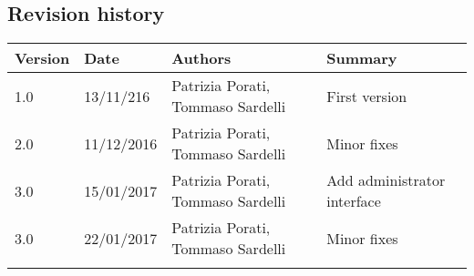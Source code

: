 \subsection{Revision history}
\begin{tabular}{|l|l|l|l|}
	\hline
	\textbf{Version}	& \textbf{Date}	& \textbf{Authors}	& \textbf{Summary}\\
	\hline
	1.0 	& 13/11/216 	& Patrizia Porati, Tommaso Sardelli 	& First version\\
	\hline
	2.0 	& 11/12/2016 	& Patrizia Porati, Tommaso Sardelli 	& Minor fixes\\
	\hline
	3.0		& 15/01/2017 	& Patrizia Porati, Tommaso Sardelli 	& Add administrator interface\\
	\hline
	3.0 	& 22/01/2017 	& Patrizia Porati, Tommaso Sardelli 	& Minor fixes\\
	\hlines
\end{tabular}